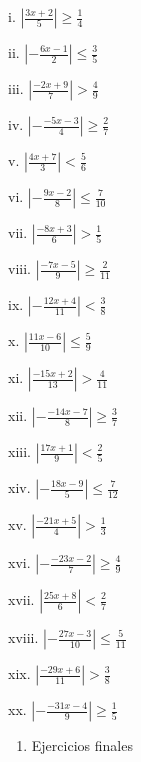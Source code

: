 \documentclass[]{book}
\providecommand{\tightlist}{%
  \setlength{\itemsep}{0pt}\setlength{\parskip}{0pt}}
\begin{document}
\begin{multicols}{2}
    i. $|\frac{3x+2}{5}| \geq \frac{1}{4}$
    
    ii. $|-\frac{6x-1}{2}| \leq \frac{3}{5}$
    
    iii. $|\frac{-2x+9}{7}| > \frac{4}{9}$
    
    iv. $|-\frac{-5x-3}{4}| \geq \frac{2}{7}$
    
    v. $|\frac{4x+7}{3}| < \frac{5}{6}$
    
    vi. $|-\frac{9x-2}{8}| \leq \frac{7}{10}$
    
    vii. $|\frac{-8x+3}{6}| > \frac{1}{5}$
    
    viii. $|\frac{-7x-5}{9}| \geq \frac{2}{11}$
    
    ix. $|-\frac{12x+4}{11}| < \frac{3}{8}$
    
    x. $|\frac{11x-6}{10}| \leq \frac{5}{9}$
    
    xi. $|\frac{-15x+2}{13}| > \frac{4}{11}$
    
    xii. $|-\frac{-14x-7}{8}| \geq \frac{3}{7}$
    
    xiii. $|\frac{17x+1}{9}| < \frac{2}{5}$
    
    xiv. $|-\frac{18x-9}{5}| \leq \frac{7}{12}$
    
    xv. $|\frac{-21x+5}{4}| > \frac{1}{3}$
    
    xvi. $|-\frac{-23x-2}{7}| \geq \frac{4}{9}$
    
    xvii. $|\frac{25x+8}{6}| < \frac{2}{7}$
    
    xviii. $|-\frac{27x-3}{10}| \leq \frac{5}{11}$
    
    xix. $|\frac{-29x+6}{11}| > \frac{3}{8}$
    
    xx. $|-\frac{-31x-4}{9}| \geq \frac{1}{5}$
\end{multicols}

\begin{enumerate}
\def\labelenumi{\arabic{enumi}.}
\setcounter{enumi}{4}
\tightlist
\item
  Ejercicios finales
\end{enumerate}
\end{document}
